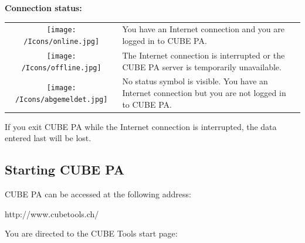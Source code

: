 \vspace{\baselineskip}

\textbf{Connection status:}

\vspace{\baselineskip}

\begin{tabular}{c | p{14cm} l} %

\vspace{+1pt}	
\texttt{[image: /Icons/online.jpg]} & You have an Internet connection and you are logged in to CUBE PA. \\
\vspace{+1pt}	
\texttt{[image: /Icons/offline.jpg]} & The Internet connection is interrupted or the CUBE PA server is temporarily unavailable. \\
\vspace{+1pt}	
\texttt{[image: /Icons/abgemeldet.jpg]} & No status symbol is visible. You have an Internet connection but you are not logged in to CUBE PA. \\


\end{tabular}

\vspace{\baselineskip}

If you exit CUBE PA while the Internet connection is interrupted, the data entered last will be lost.

\subsection{Starting CUBE PA}


CUBE PA can be accessed at the following address:

\vspace{\baselineskip}

{\color{red} http://www.cubetools.ch/}

\vspace{\baselineskip}

You are directed to the CUBE Tools start page:

